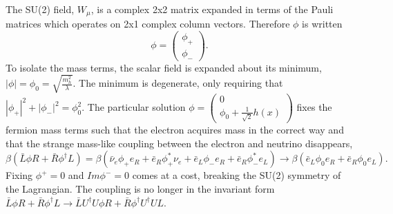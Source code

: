 The SU(2) field, $W_\mu$, is a complex 2x2 matrix expanded in terms of the Pauli matrices which operates on 2x1 complex column vectors. Therefore $\phi$ is written 
\begin{equation}
\phi = 
\begin{pmatrix}
\phi_+ \\ \phi_-
\end{pmatrix}.
\end{equation}
To isolate the mass terms, the scalar field is expanded about its minimum, $|\phi| = \phi_0 = \sqrt{\frac{m_h^2}{\lambda}}$. The minimum is degenerate, only requiring that $|\phi_+|^{2} + |\phi_-|^{2} = \phi_0^2$. The particular solution $\phi = \begin{pmatrix} 0 \\ \phi_0 + \frac{1}{\sqrt{2}}h(x) \end{pmatrix}$ fixes the fermion mass terms such that the electron acquires mass in the correct way and that the strange mass-like coupling between the electron and neutrino disappears,
\begin{equation}
\beta(\bar{L}\phi R + \bar{R}\phi^\dagger L) = \beta(\bar{\nu}_e\phi_+e_R + \bar{e}_R\phi_+^{*}\nu_e + \bar{e}_L\phi_-e_R + \bar{e}_R\phi_-^{*}e_L) \rightarrow 
\beta(\bar{e}_L\phi_0e_R + \bar{e}_R\phi_0e_L).
\end{equation}
Fixing $\phi^+=0$ and $Im\phi^-=0$ comes at a cost, breaking the SU(2) symmetry of the Lagrangian. The coupling is no longer in the invariant form $\bar{L}\phi R + \bar{R}\phi^\dagger L \rightarrow \bar{L}U^\dagger U\phi R + \bar{R}\phi^\dagger U^\dagger UL$. 

